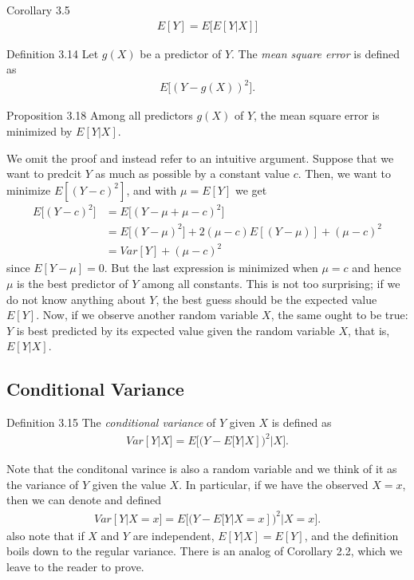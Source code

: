 \begin{boks}{Corollary 3.5}
  \begin{align*}
    E[Y] = E\Big[E[Y|X]\Big]
  \end{align*}
\end{boks}

\begin{boks}{Definition 3.14}
  Let $g(X)$ be a predictor of $Y$. The \textit{mean square error} is defined as
  \begin{align*}
    E\Big[(Y - g(X))^2\Big].
  \end{align*}
\end{boks}

\begin{boks}{Proposition 3.18}
  Among all predictors $g(X)$ of $Y$, the mean square error is minimized by $E[Y|X]$.
\end{boks}

We omit the proof and instead refer to an intuitive argument. Suppose that we want to predcit $Y$ as much as possible by a constant value $c$. Then, we want to minimize $E[(Y - c)^2]$, and with $\mu = E[Y]$ we get
\begin{align*}
  E\Big[(Y - c)^2\Big] &= E\Big[(Y - \mu + \mu - c)^2\Big]\\
  &= E\Big[(Y - \mu)^2] + 2(\mu - c)E[(Y - \mu)] + (\mu - c)^2\\
  &= Var[Y] + (\mu - c)^2
\end{align*}
since $E[Y - \mu] = 0$. But the last expression is minimized when $\mu = c$ and hence $\mu$ is the best predictor of $Y$ among all constants. This is not too surprising; if we do not know anything about $Y$, the best guess should be the expected value $E[Y]$. Now, if we observe another random variable $X$, the same ought to be true: $Y$ is best predicted by its expected value given the random variable $X$, that is, $E[Y|X]$.

\subsection{Conditional Variance}
\begin{boks}{Definition 3.15}
  The \textit{conditional variance} of $Y$ given $X$ is defined as
  \begin{align*}
    Var[Y|X] = E\Big[(Y - E[Y|X])^2|X\Big].
  \end{align*}
\end{boks}

Note that the conditonal varince is also a random variable and we think of it as the variance of $Y$ given the value $X$. In particular,  if we have the observed $X = x$, then we can denote and defined
\begin{align*}
  Var[Y|X = x] = E\Big[(Y - E[Y|X = x])^2|X = x\Big].
\end{align*}
also note that if $X$ and $Y$ are independent, $E[Y|X]=E[Y]$, and the definition boils down to the regular variance. There is an analog of Corollary 2.2, which we leave to the reader to prove.

